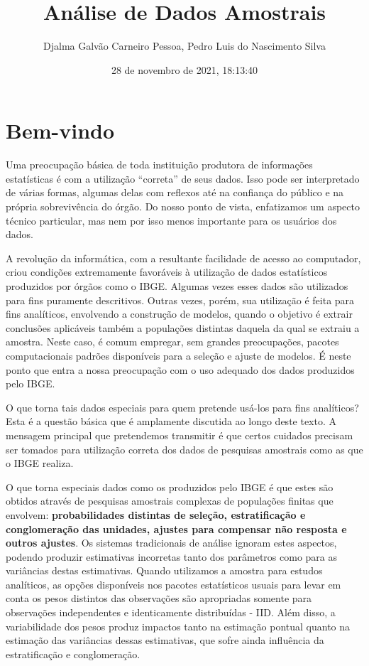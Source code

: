 \documentclass[
  12pt,
  brazilian,
]{book}
\title{Análise de Dados Amostrais}
\author{Djalma Galvão Carneiro Pessoa, Pedro Luis do Nascimento Silva}
\date{28 de novembro de 2021, 18:13:40}
\theoremstyle{definition}
\theoremstyle{definition}
\theoremstyle{definition}
\theoremstyle{definition}
\theoremstyle{remark}
\begin{document}
\maketitle

{
\setcounter{tocdepth}{1}
\tableofcontents
}
\hypertarget{bem-vindo}{%
\chapter*{Bem-vindo}\label{bem-vindo}}

Uma preocupação básica de toda instituição produtora de informações estatísticas é com a utilização ``correta'' de seus dados. Isso pode ser interpretado de várias formas, algumas delas com reflexos até na confiança do público e na
própria sobrevivência do órgão. Do nosso ponto de vista, enfatizamos um aspecto
técnico particular, mas nem por isso menos importante para os usuários dos dados.

A revolução da informática, com a resultante facilidade de acesso ao computador, criou condições extremamente favoráveis à utilização de dados estatísticos produzidos por órgãos como o IBGE. Algumas vezes esses dados são utilizados para fins puramente descritivos. Outras vezes, porém, sua utilização é feita para fins analíticos, envolvendo a construção de modelos, quando o objetivo é extrair conclusões aplicáveis também a populações distintas daquela da qual se extraiu a amostra. Neste caso, é comum empregar, sem grandes preocupações, pacotes
computacionais padrões disponíveis para a seleção e ajuste de modelos. É neste ponto que entra a nossa preocupação com o uso adequado dos dados produzidos pelo IBGE.

O que torna tais dados especiais para quem pretende usá-los para fins
analíticos? Esta é a questão básica que é amplamente discutida ao longo deste texto. A mensagem principal que pretendemos transmitir é que certos cuidados precisam ser tomados para utilização correta dos dados de pesquisas amostrais como as que o IBGE realiza.

O que torna especiais dados como os produzidos pelo IBGE é que estes são obtidos através de pesquisas amostrais complexas de populações finitas que envolvem: \textbf{probabilidades distintas de seleção, estratificação e conglomeração das unidades, ajustes para compensar não resposta e outros ajustes}. Os sistemas
tradicionais de análise ignoram estes aspectos, podendo produzir estimativas incorretas tanto dos parâmetros como para as variâncias destas estimativas. Quando utilizamos a amostra para estudos analíticos, as opções disponíveis nos pacotes estatísticos usuais para levar em conta os pesos distintos das observações são apropriadas somente para observações independentes e identicamente distribuídas - IID. Além disso, a variabilidade dos pesos produz
impactos tanto na estimação pontual quanto na estimação das variâncias dessas estimativas, que sofre ainda influência da estratificação e conglomeração.
\end{document}
